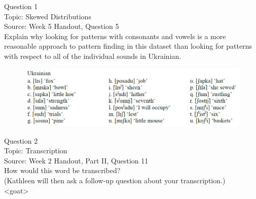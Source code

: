 \documentclass[12pt]{article}
\begin{document}
\begin{center}
\textbf{{\color{blue}{\HUGE START OF EXAM\\}}}

\textbf{{\color{blue}{\HUGE Student ID: 94263\\}}}

\textbf{{\color{blue}{\HUGE 4:20\\}}}

\end{center}
\newpage

{\large Question 1}\\

Topic: Skewed Distributions\\
Source: Week 5 Handout, Question 5\\

Explain why looking for patterns with consonants and vowels is a more reasonable approach to pattern finding in this dataset than looking for patterns with respect to all of the individual sounds in Ukrainian.\\

\begin{figure}[H]
\includegraphics{../images/ukrainian.png}
\end{figure}

\newpage

{\large Question 2}\\

Topic: Transcription\\
Source: Week 2 Handout, Part II, Question 11\\

How would this word be transcribed?\\ (Kathleen will then ask a follow-up question about your transcription.)\\

<goat>


\newpage

\begin{center}
\textbf{{\color{red}{\HUGE END OF EXAM}}}\\

\end{center}
\newpage
\end{document}
